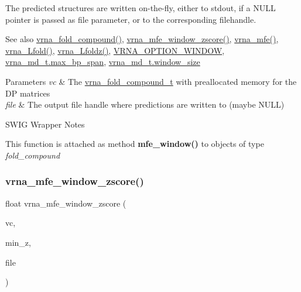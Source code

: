 The predicted structures are written on-\/the-\/fly, either to stdout, if a N\+U\+LL pointer is passed as file parameter, or to the corresponding filehandle.

\begin{DoxySeeAlso}{See also}
\hyperlink{group__fold__compound_ga6601d994ba32b11511b36f68b08403be}{vrna\+\_\+fold\+\_\+compound()}, \hyperlink{group__mfe__window_gaa4f67ae94efd08d800c17f9b53423fd6}{vrna\+\_\+mfe\+\_\+window\+\_\+zscore()}, \hyperlink{group__mfe__global_gabd3b147371ccf25c577f88bbbaf159fd}{vrna\+\_\+mfe()}, \hyperlink{group__mfe__window_ga4918cce52bf69c1913cda503b2ac75d8}{vrna\+\_\+\+Lfold()}, \hyperlink{group__mfe__window_ga27fddda5fc63eb49c861e38845fc34b4}{vrna\+\_\+\+Lfoldz()}, \hyperlink{group__fold__compound_ga2b2a8009ccdccc3eb1571556261aee8e}{V\+R\+N\+A\+\_\+\+O\+P\+T\+I\+O\+N\+\_\+\+W\+I\+N\+D\+OW}, \hyperlink{group__model__details_a659e5fcc6e8c9f1a68e7de6548eef3b0}{vrna\+\_\+md\+\_\+t.\+max\+\_\+bp\+\_\+span}, \hyperlink{group__model__details_abea42f9229f8d8d6bcbedef316315bfc}{vrna\+\_\+md\+\_\+t.\+window\+\_\+size}
\end{DoxySeeAlso}

\begin{DoxyParams}{Parameters}
{\em vc} & The \hyperlink{group__fold__compound_ga1b0cef17fd40466cef5968eaeeff6166}{vrna\+\_\+fold\+\_\+compound\+\_\+t} with preallocated memory for the DP matrices \\
\hline
{\em file} & The output file handle where predictions are written to (maybe N\+U\+LL)\\
\hline
\end{DoxyParams}
\begin{DoxyRefDesc}{S\+W\+I\+G Wrapper Notes}
\item[\hyperlink{wrappers__wrappers000082}{S\+W\+I\+G Wrapper Notes}]This function is attached as method {\bfseries mfe\+\_\+window()} to objects of type {\itshape fold\+\_\+compound} \end{DoxyRefDesc}
\mbox{\label{group__mfe__window_gaa4f67ae94efd08d800c17f9b53423fd6}} 
\subsubsection{\texorpdfstring{vrna\+\_\+mfe\+\_\+window\+\_\+zscore()}{vrna\_mfe\_window\_zscore()}}
{\footnotesize\ttfamily float vrna\+\_\+mfe\+\_\+window\+\_\+zscore (\begin{DoxyParamCaption}\item[{\hyperlink{group__fold__compound_ga1b0cef17fd40466cef5968eaeeff6166}{vrna\+\_\+fold\+\_\+compound\+\_\+t} $\ast$}]{vc,  }\item[{double}]{min\+\_\+z,  }\item[{F\+I\+LE $\ast$}]{file }\end{DoxyParamCaption})}



